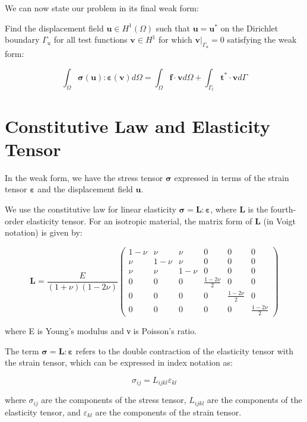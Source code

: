 \documentclass[
  11pt,
  a4paper,
]{scrbook}
\begin{document}
We can now state our problem in its final weak form:

Find the displacement field \(\boldsymbol{u} \in H^1(\Omega)\) such that
\(\boldsymbol{u} = \boldsymbol{u}^*\) on the Dirichlet boundary
\(\Gamma_u\) for all test functions \(\boldsymbol{v}\in H^1\) for which
\(\boldsymbol{v}|_{\Gamma_u}=0\) satisfying the weak form:

\[\int_{\Omega} \boldsymbol{\sigma}(\mathbf{u}) : \boldsymbol{\varepsilon}(\mathbf{v}) d\Omega = \int_{\Omega} \mathbf{f} \cdot \mathbf{v} d\Omega + \int_{\Gamma_t} \mathbf{t}^* \cdot \mathbf{v} d\Gamma\]

\section{Constitutive Law and Elasticity
Tensor}\label{constitutive-law-and-elasticity-tensor}

In the weak form, we have the stress tensor \(\boldsymbol{\sigma}\)
expressed in terms of the strain tensor \(\boldsymbol{\varepsilon}\) and
the displacement field \(\mathbf{u}\).

We use the constitutive law for linear elasticity
\(\boldsymbol{\sigma}=\boldsymbol{L}:\boldsymbol{\varepsilon}\), where
\(\boldsymbol{L}\) is the fourth-order elasticity tensor. For an
isotropic material, the matrix form of \(\boldsymbol{L}\) (in Voigt
notation) is given by:

\[\mathbf{L} = \frac{E}{(1+\nu)(1-2\nu)}
\begin{pmatrix}
1-\nu & \nu & \nu & 0 & 0 & 0 \\
\nu & 1-\nu & \nu & 0 & 0 & 0 \\
\nu & \nu & 1-\nu & 0 & 0 & 0 \\
0 & 0 & 0 & \frac{1-2\nu}{2} & 0 & 0 \\
0 & 0 & 0 & 0 & \frac{1-2\nu}{2} & 0 \\
0 & 0 & 0 & 0 & 0 & \frac{1-2\nu}{2}
\end{pmatrix}\]

where E is Young's modulus and ν is Poisson's ratio.

The term \(\boldsymbol{\sigma}=\boldsymbol{L}:\boldsymbol{\varepsilon}\)
refers to the double contraction of the elasticity tensor with the
strain tensor, which can be expressed in index notation as:

\[\sigma_{ij} = L_{ijkl} \varepsilon_{kl}\]

where \(\sigma_{ij}\) are the components of the stress tensor,
\(L_{ijkl}\) are the components of the elasticity tensor, and
\(\varepsilon_{kl}\) are the components of the strain tensor.
\end{document}
